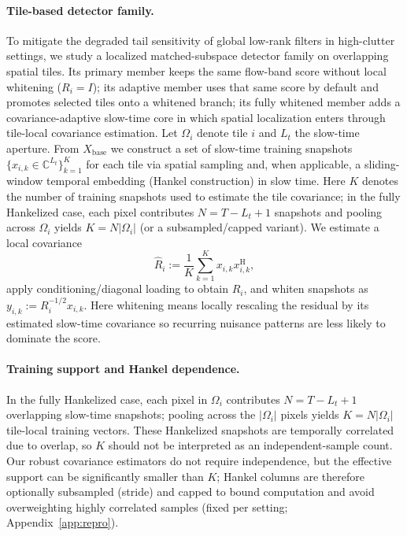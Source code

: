 \documentclass[11pt]{article}
\newcommand{\wh}{\widehat}
\newcommand{\Hh}{^{\mathrm{H}}}
\newif\ifPAPERONLY
\newcommand{\SuppOrApp}[1]{\ifPAPERONLY Supplementary Material\else Appendix~\ref{#1}\fi}
\begin{document}
\paragraph{Tile-based detector family.}
To mitigate the degraded tail sensitivity of global low-rank filters in high-clutter settings, we study a localized matched-subspace detector family on overlapping spatial tiles. Its primary member keeps the same flow-band score without local whitening ($R_i=I$); its adaptive member uses that same score by default and promotes selected tiles onto a whitened branch; its fully whitened member adds a covariance-adaptive slow-time core in which spatial localization enters through tile-local covariance estimation. Let $\Omega_i$ denote tile $i$ and $L_t$ the slow-time aperture. From $X_{\mathrm{base}}$ we construct a set of slow-time training snapshots $\{x_{i,k}\in\mathbb{C}^{L_t}\}_{k=1}^K$ for each tile via spatial sampling and, when applicable, a sliding-window temporal embedding (Hankel construction) in slow time. Here $K$ denotes the number of training snapshots used to estimate the tile covariance; in the fully Hankelized case, each pixel contributes $N=T-L_t+1$ snapshots and pooling across $\Omega_i$ yields $K=N|\Omega_i|$ (or a subsampled/capped variant). We estimate a local covariance
\[
  \wh R_i := \frac{1}{K}\sum_{k=1}^K x_{i,k}x_{i,k}\Hh,
\]
apply conditioning/diagonal loading to obtain $R_i$, and whiten snapshots as $y_{i,k}:=R_i^{-1/2}x_{i,k}$.
Here whitening means locally rescaling the residual by its estimated slow-time covariance so recurring nuisance patterns are less likely to dominate the score.
\paragraph{Training support and Hankel dependence.}
In the fully Hankelized case, each pixel in $\Omega_i$ contributes $N=T-L_t+1$ overlapping slow-time snapshots; pooling across the $|\Omega_i|$ pixels yields $K=N|\Omega_i|$ tile-local training vectors. These Hankelized snapshots are temporally correlated due to overlap, so $K$ should not be interpreted as an independent-sample count. Our robust covariance estimators do not require independence, but the effective support can be significantly smaller than $K$; Hankel columns are therefore optionally subsampled (stride) and capped to bound computation and avoid overweighting highly correlated samples (fixed per setting; \SuppOrApp{app:repro}).
\end{document}
